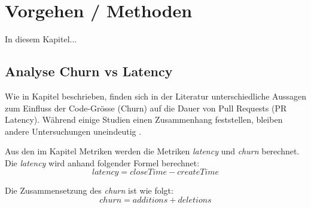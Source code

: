


\chapter{Vorgehen / Methoden} %

\label{Chapter3} %


In diesem Kapitel...

\section{Analyse Churn vs Latency}
\label{sec:AnalyseChurnvsLatency}
Wie in Kapitel  beschrieben, finden sich in der Literatur unterschiedliche Aussagen zum Einfluss der Code-Grösse (Churn) auf die Dauer von Pull Requests (PR Latency). Während einige Studien einen Zusammenhang feststellen, bleiben andere Untersuchungen uneindeutig \parencite{hasan_understanding_2023}\parencite{kudrjavets_small_2022}.


Aus den im Kapitel  Metriken werden die Metriken \textit{latency} und \textit{churn} berechnet. Die \textit{latency} wird anhand folgender Formel berechnet:
\begin{equation}
latency = closeTime - createTime
\end{equation}

Die Zusammensetzung des \textit{churn} ist wie folgt:
\begin{equation}
churn = additions + deletions
\end{equation}

